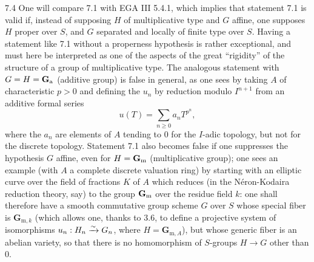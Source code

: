 \begin{remark}{7.4}\label{IX.7.4}
One will compare 7.1 with EGA III 5.4.1, which implies that statement 7.1 is valid if, instead of supposing $H$ of multiplicative type and $G$ affine, one supposes $H$ proper over $S$, and $G$ separated and locally of finite type over $S$. Having a statement like 7.1 without a properness hypothesis is rather exceptional, and must here be interpreted as one of the aspects of the great ``rigidity'' of the structure of a group of multiplicative type. The analogous statement with $G=H=\mathbf{G}_{\mathrm{a}}$ (additive group) is false in general, as one sees by taking $A$ of characteristic $p>0$ and defining the $u_n$ by reduction modulo $I^{n+1}$ from an additive formal series
\[
u(T)=\sum_{n\geq0}a_n T^{p^n},
\]
where the $a_n$ are elements of $A$ tending to 0 for the $I$-adic topology, but not for the discrete topology. Statement 7.1 also becomes false if one suppresses the hypothesis $G$ affine, even for $H=\mathbf{G}_{\mathrm{m}}$ (multiplicative group); one sees an example (with $A$ a complete discrete valuation ring) by starting with an elliptic curve over the field of fractions $K$ of $A$ which reduces (in the Néron-Kodaira reduction theory, say) to the group $\mathbf{G}_{\mathrm{m}}$ over the residue field $k$: one shall therefore have a smooth commutative group scheme $G$ over $S$ whose special fiber is $\mathbf{G}_{\mathrm{m},k}$ (which allows one, thanks to 3.6, to define a projective system of isomorphisms $u_n:H_n\xrightarrow{\sim} G_n$, where $H=\mathbf{G}_{\mathrm{m},A}$), but whose generic fiber is an abelian variety, so that there is no homomorphism of $S$-groups $H\to G$ other than 0.
\end{remark}

